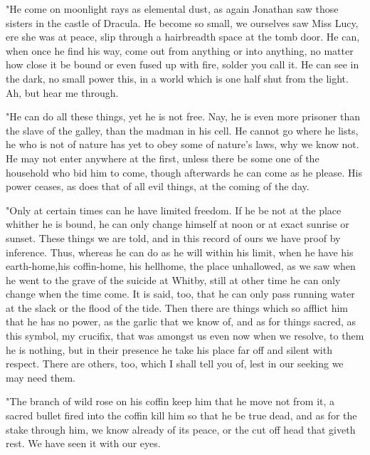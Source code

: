 "He come on moonlight rays as elemental dust, as again Jonathan saw those sisters in the castle of Dracula. He become so small, we ourselves saw Miss Lucy, ere she was at peace, slip through a hairbreadth space at the tomb door. He can, when once he find his way, come out from anything or into anything, no matter how close it be bound or even fused up with fire, solder you call it. He can see in the dark, no small power this, in a world which is one half shut from the light. Ah, but hear me through. 

"He can do all these things, yet he is not free. Nay, he is even more prisoner than the slave of the galley, than the madman in his cell. He cannot go where he lists, he who is not of nature has yet to obey some of nature's laws, why we know not. He may not enter anywhere at the first, unless there be some one of the household who bid him to come, though afterwards he can come as he please. His power ceases, as does that of all evil things, at the coming of the day. 

"Only at certain times can he have limited freedom. If he be not at the place whither he is bound, he can only change himself at noon or at exact sunrise or sunset. These things we are told, and in this record of ours we have proof by inference. Thus, whereas he can do as he will within his limit, when he have his earth-home,his coffin-home, his hellhome, the place unhallowed, as we saw when he went to the grave of the suicide at Whitby, still at other time he can only change when the time come. It is said, too, that he can only pass running water at the slack or the flood of the tide. Then there are things which so afflict him that he has no power, as the garlic that we know of, and as for things sacred, as this symbol, my crucifix, that was amongst us even now when we resolve, to them he is nothing, but in their presence he take his place far off and silent with respect. There are others, too, which I shall tell you of, lest in our seeking we may need them. 

"The branch of wild rose on his coffin keep him that he move not from it, a sacred bullet fired into the coffin kill him so that he be true dead, and as for the stake through him, we know already of its peace, or the cut off head that giveth rest. We have seen it with our eyes. 

